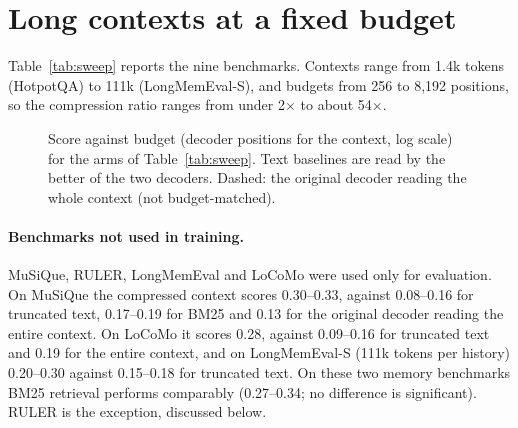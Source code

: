 \documentclass[11pt]{article}
\begin{document}
\section{Long contexts at a fixed budget}
\label{sec:sweep}

Table~\ref{tab:sweep} reports the nine benchmarks. Contexts range from 1.4k tokens (HotpotQA) to
111k (LongMemEval-S), and budgets from 256 to 8{,}192 positions, so the compression ratio ranges from
under 2$\times$ to about 54$\times$.

\begin{table}[p]
\centering
\small
\setlength{\tabcolsep}{4.5pt}

\caption{Accuracy by benchmark and budget (decoder positions available to the context); the second
line of each benchmark gives its mean context length. BABILong, RULER and QuALITY: accuracy; the
others: LLM-judge accuracy. Text: the trained decoder reading middle-truncated text; base: the
original decoder reading it. BM25, LongLLMLingua and summary: the better of the two decoders.
LongLLMLingua was run at one budget for NarrativeQA and LongMemEval-S; summaries exist for the
budgets shown (QuALITY: 60 and 56 items). Bold: best budget-matched arm. The last column is the
original decoder reading the whole, untruncated context on the same items and is not budget-matched;
it was not run for LongMemEval-S (contexts above the 32k-token limit of our full-context runs) and has
too few shared items for NarrativeQA.}
\label{tab:sweep}
\end{table}

\begin{figure}[p]
\centering

\caption{Score against budget (decoder positions for the context, log scale) for the arms of
Table~\ref{tab:sweep}. Text baselines are read by the better of the two decoders. Dashed: the
original decoder reading the whole context (not budget-matched).}
\label{fig:budget}
\end{figure}

\paragraph{Benchmarks not used in training.}
MuSiQue, RULER, LongMemEval and LoCoMo were used only for evaluation. On MuSiQue the compressed
context scores 0.30--0.33, against 0.08--0.16 for truncated text, 0.17--0.19 for BM25 and 0.13 for the
original decoder reading the entire context. On LoCoMo it scores 0.28, against 0.09--0.16 for truncated
text and 0.19 for the entire context, and on LongMemEval-S (111k tokens per history) 0.20--0.30 against
0.15--0.18 for truncated text. On these two memory benchmarks BM25 retrieval performs comparably
(0.27--0.34; no difference is significant). RULER is the exception, discussed below.
\end{document}
